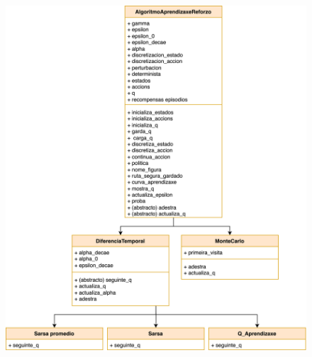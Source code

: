 \documentclass{article}
\begin{document}
\begin{figure}[h]
    \centering
    \includegraphics[width=0.7\linewidth]{herencia.drawio.png}
    
    \label{fig:enter-label}
\end{figure}
\end{document}
